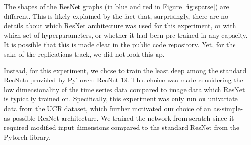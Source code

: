\documentclass{article}
\begin{document}

The shapes of the ResNet graphs (in blue and red in Figure \ref{fig:sparse}) are different. %
This is likely explained by
the fact that, surprisingly, there are no details about which ResNet architecture was used for this experiment, or with which set of hyperparameters, or whether it had been pre-trained in any capacity. It is possible that this is made clear in the public code repository. Yet, for the sake of the replications track, we did not look this up.

Instead, for this experiment, we chose to train the least deep among the standard ResNets provided by PyTorch: ResNet-18. This choice was made considering the low dimensionality of the time series data compared to image data which ResNet is typically trained on. Specifically, this experiment was only run on univariate data from the UCR dataset, which further motivated our choice of an as-simple-as-possible ResNet architecture. We trained the network from scratch since it required modified input dimensions compared to the standard ResNet from the Pytorch library.
\end{document}

